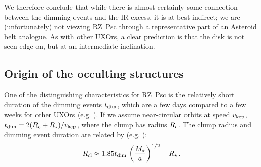 \documentclass[]{rsos}
\begin{document}
We therefore conclude that while there is almost certainly some connection between the
dimming events and the IR excess, it is at best indirect; we are (unfortunately) not
viewing RZ~Psc through a representative part of an Asteroid belt analogue. As with other
UXOrs, a clear prediction is that the disk is not seen edge-on, but at an intermediate
inclination.

\subsection{Origin of the occulting structures}\label{ss:orig}

One of the distinguishing characteristics for RZ~Psc is the relatively short duration of
the dimming events $t_{\rm dim}$, which are a few days compared to a few weeks for other
UXOrs (e.g. \cite{1999AJ....118.1043H,2010A&A...511L...9C}). If we assume near-circular
orbits at speed $v_{\rm kep}$, $t_{\rm dim}=2(R_{\rm c}+R_\star)/v_{\rm kep}$, where the
clump has radius $R_{\rm c}$.  The clump radius and dimming event duration are related by
(e.g. \cite{2016ApJ...816...69A,2016MNRAS.457.3988B}):
\begin{equation}
  R_{\rm cl} \approx 1.85 t_{\rm dim} \, \left( \frac{M_\star}{a} \right)^{1/2} - R_\star \, .
\end{equation}

\end{document}
